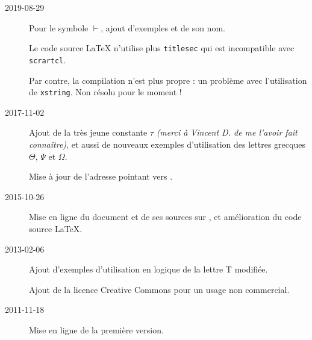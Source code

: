 
\begin{description}
	\item[2019-08-29] Pour le symbole $\vdash$, ajout d'exemples et de son nom.
	
	Le code source \LaTeX{} n'utilise plus \verb+titlesec+ qui est incompatible avec \verb+scrartcl+.
	
	Par contre, la compilation n'est plus propre : un problème avec l'utilisation de \verb+xstring+. Non résolu pour le moment ! 
	
	\item[2017-11-02] Ajout de la très jeune constante $\tau$ \emph{(merci à Vincent D. de me l'avoir fait connaître)}, et aussi de nouveaux exemples d'utilisation des lettres grecques $\Theta$, $\Psi$ et $\Omega$.
	
	Mise à jour de l'adresse pointant vers .

	\item[2015-10-26] Mise en ligne du document et de ses sources sur , et amélioration du code source \LaTeX.

	\item[2013-02-06] Ajout d'exemples d'utilisation en logique de la lettre T modifiée.

Ajout de la licence Creative Commons pour un usage non commercial.

	\item[2011-11-18] Mise en ligne de la première version.
\end{description}
